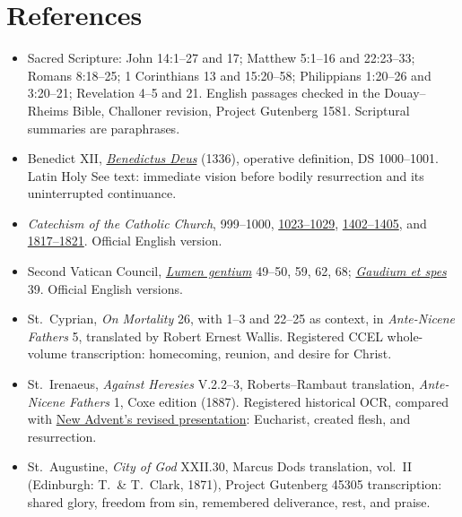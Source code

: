 \section{References}
\begingroup\small
\begin{itemize}[leftmargin=1.25em,itemsep=0pt,parsep=0pt]
\item Sacred Scripture: John 14:1--27 and 17; Matthew 5:1--16 and 22:23--33; Romans 8:18--25; 1 Corinthians 13 and 15:20--58; Philippians 1:20--26 and 3:20--21; Revelation 4--5 and 21. English passages checked in the Douay--Rheims Bible, Challoner revision, Project Gutenberg 1581. Scriptural summaries are paraphrases.
\item Benedict XII, \href{https://www.vatican.va/content/benedictus-xii/la/documents/constitutio-benedictus-deus-29-ian-1336.html}{\emph{Benedictus Deus}} (1336), operative definition, DS 1000--1001. Latin Holy See text: immediate vision before bodily resurrection and its uninterrupted continuance.
\item \emph{Catechism of the Catholic Church}, 999--1000, \href{https://www.vatican.va/archive/ENG0015/__P2M.HTM}{1023--1029}, \href{https://www.vatican.va/archive/ENG0015/__P43.HTM}{1402--1405}, and \href{https://www.vatican.va/content/catechism/en/part_three/section_one/chapter_one/article_7/ii_the_theological_virtues.index.html}{1817--1821}. Official English version.
\item Second Vatican Council, \href{https://www.vatican.va/archive/hist_councils/ii_vatican_council/documents/vat-ii_const_19641121_lumen-gentium_en.html}{\emph{Lumen gentium}} 49--50, 59, 62, 68; \href{https://www.vatican.va/archive/hist_councils/ii_vatican_council/documents/vat-ii_const_19651207_gaudium-et-spes_en.html}{\emph{Gaudium et spes}} 39. Official English versions.
\item St.~Cyprian, \emph{On Mortality} 26, with 1--3 and 22--25 as context, in \emph{Ante-Nicene Fathers} 5, translated by Robert Ernest Wallis. Registered CCEL whole-volume transcription: homecoming, reunion, and desire for Christ.
\item St.~Irenaeus, \emph{Against Heresies} V.2.2--3, Roberts--Rambaut translation, \emph{Ante-Nicene Fathers} 1, Coxe edition (1887). Registered historical OCR, compared with \href{https://www.newadvent.org/fathers/0103502.htm}{New Advent's revised presentation}: Eucharist, created flesh, and resurrection.
\item St.~Augustine, \emph{City of God} XXII.30, Marcus Dods translation, vol.~II (Edinburgh: T.~\& T.~Clark, 1871), Project Gutenberg 45305 transcription: shared glory, freedom from sin, remembered deliverance, rest, and praise.

\end{itemize}
